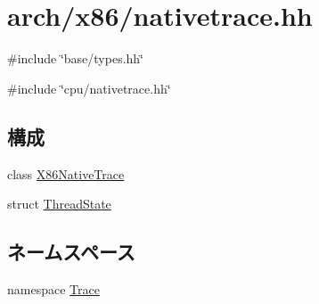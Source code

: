 \hypertarget{arch_2x86_2nativetrace_8hh}{
\section{arch/x86/nativetrace.hh}
\label{arch_2x86_2nativetrace_8hh}
}
{\ttfamily \#include \char`\"{}base/types.hh\char`\"{}}\par
{\ttfamily \#include \char`\"{}cpu/nativetrace.hh\char`\"{}}\par
\subsection*{構成}
\begin{DoxyCompactItemize}
\item 
class \hyperlink{classTrace_1_1X86NativeTrace}{X86NativeTrace}
\item 
struct \hyperlink{structTrace_1_1X86NativeTrace_1_1ThreadState}{ThreadState}
\end{DoxyCompactItemize}
\subsection*{ネームスペース}
\begin{DoxyCompactItemize}
\item 
namespace \hyperlink{namespaceTrace}{Trace}
\end{DoxyCompactItemize}
